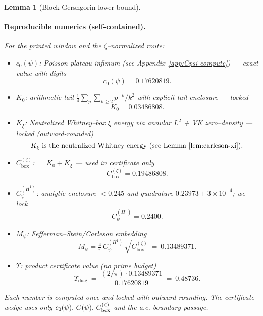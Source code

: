 \documentclass[11pt]{article}
\providecommand{\czeroplateau}{0.17620819}%
\providecommand{\CboxZeta}{K_0 + K_\xi}%
\providecommand{\CpsiHone}{0.2400}%
\providecommand{\Mpsilocked}{(4/\pi)\,\CpsiHone\,\sqrt{\CboxZeta}}
\providecommand{\UpsilonLocked}{(2/\pi)\,\Mpsilocked/\czeroplateau}%
\renewcommand{\CboxZeta}{0.19486808}
\renewcommand{\Mpsilocked}{0.13489371}
\renewcommand{\UpsilonLocked}{0.48736}
\newtheorem{lemma}{Lemma}[section]
\theoremstyle{definition}
\theoremstyle{remark}
\begin{document}
\begin{lemma}[Block Gershgorin lower bound]
\paragraph{Reproducible numerics (self-contained).}
For the printed window and the \(\zeta\)–normalized route:
\begin{itemize}
\item \(c_0(\psi)\): Poisson plateau infimum (see Appendix~\ref{app:Cpsi-compute}) — exact value with digits
\[ c_0(\psi)=0.17620819. \]
\item \(K_0\): arithmetic tail \(\tfrac14\sum_{p}\sum_{k\ge2} p^{-k}/k^2\) with explicit tail enclosure — locked
\[ K_0=0.03486808. \]
\item \(K_\xi\): Neutralized Whitney–box \(\xi\) energy via annular $L^2$ + VK zero–density — locked (outward-rounded)
\[ K_\xi \text{ is the neutralized Whitney energy (see Lemma~\ref{lem:carleson-xi}).} \]
\item \(C_{\mathrm{box}}^{(\zeta)}\): $=K_0+K_\xi$ — used in certificate only
\[ C_{\mathrm{box}}^{(\zeta)}=\CboxZeta. \]
\item \(C_\psi^{(H^1)}\): analytic enclosure $<0.245$ and quadrature $0.23973\pm3\times10^{-4}$; we lock
\[ C_\psi^{(H^1)}=0.2400. \]
\item \(M_\psi\): Fefferman–Stein/Carleson embedding
\[ M_\psi=\tfrac{4}{\pi}\,C_\psi^{(H^1)}\,\sqrt{C_{\mathrm{box}}^{(\zeta)}}\ =\ \Mpsilocked. \]
\item \(\Upsilon\): product certificate value (no prime budget)
\[ \Upsilon_{\mathrm{diag}}\ =\ \frac{(2/\pi)\cdot \Mpsilocked}{0.17620819}\ =\ \UpsilonLocked. \]
\end{itemize}
Each number is computed once and locked with outward rounding. The certificate wedge uses only \(c_0(\psi),\,C(\psi),\,C_{\rm box}^{(\zeta)}\) and the a.e. boundary passage.





\vspace{1.0cm}

\end{lemma}
\end{document}
